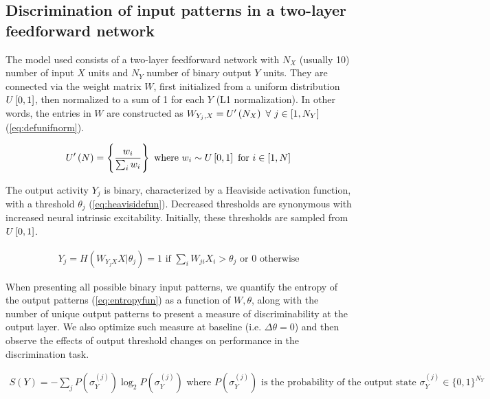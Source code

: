 \subsection{Discrimination of input patterns in a two-layer feedforward network}

The model used consists of a two-layer feedforward network
        with $N_X$ (usually 10) number of input $X$ units
        and $N_Y$ number of binary output $Y$ units.
    They are connected via the weight matrix $W$,
        first initialized from a uniform distribution $U\left[0,1\right]$,
        then normalized to a sum of 1 for each $Y$ (L1 normalization).
    In other words, the entries in $W$ are constructed as
        $W_{Y_j,X} = U^{\prime}\left(N_X\right) \ \forall \ j \in [1, N_Y]$
        (\autoref{eq:defunifnorm}).

\vspace{-1em}
\begin{align}
    U^{\prime}\left(N\right) = \left\{
            \dfrac{w_i}{\sum_i w_i}
            \right\}
        \text{ where } w_i \sim U\left[0,1\right]
        \text{ for }
        i \in [1, N]
    \label{eq:defunifnorm}
\end{align}

The output activity $Y_j$ is binary,
        characterized by a Heaviside activation function,
        with a threshold $\theta_j$ (\autoref{eq:heavisidefun}).
    Decreased thresholds are synonymous with increased neural intrinsic excitability.
    Initially, these thresholds are sampled from $U\left[0,1\right]$.

\vspace{-1em}
\begin{align}
    Y_j = H(W_{Y_j X} X | \theta_j) =
    1 \text{  if  } \sum_i W_{ji} X_i > \theta_j
    \text{ or } 0 \text{  otherwise}
    \label{eq:heavisidefun}
\end{align}

When presenting all possible binary input patterns,
        we quantify the entropy of the output patterns (\autoref{eq:entropyfun}) as a function of $W, \theta$,
        along with the number of unique output patterns
        to present a measure of discriminability at the output layer.
    We also optimize such measure at baseline (i.e. $\Delta \theta = 0$)
        and then observe the effects of output threshold changes on performance in the discrimination task.


\vspace{-1em}
\begin{align}
    S(Y) = - \sum_j
        P\left(\sigma_Y^{(j)}\right)
        \log_2 P\left(\sigma_Y^{(j)}\right)
    \text{ where } P\left(\sigma_Y^{(j)}\right)
    \text{ is the probability of the output state }
    \sigma_Y^{(j)} \in \{0,1\}^{N_Y}
    \label{eq:entropyfun}
\end{align}


